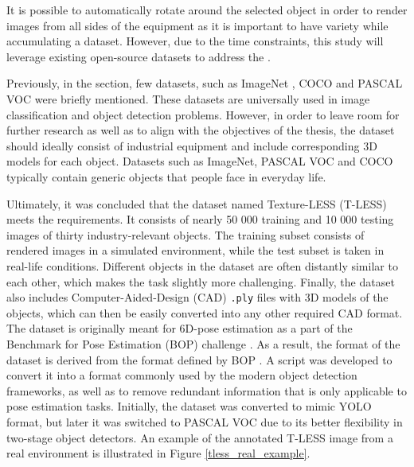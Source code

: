 It is possible to automatically rotate around the selected object in order to render images from all sides of the equipment as it is important to have variety while accumulating a dataset. However, due to the time constraints, this study will leverage existing open-source datasets to address the . 

Previously, in the  section, few datasets, such as ImageNet \cite{Russakovsky2014}, COCO \cite{Lin2014} and PASCAL VOC \cite{Everingham10} were briefly mentioned. These datasets are universally used in image classification and object detection problems. However, in order to leave room for further research as well as to align with the objectives of the thesis, the dataset should ideally consist of industrial equipment and include corresponding 3D models for each object. Datasets such as ImageNet, PASCAL VOC and COCO typically contain generic objects that people face in everyday life. 

Ultimately, it was concluded that the dataset named Texture-LESS (T-LESS)  \cite{hodan2017tless} meets the requirements. It consists of nearly 50 000 training and 10 000 testing images of thirty industry-relevant objects. The training subset consists of rendered images in a simulated environment, while the test subset is taken in real-life conditions.  Different objects in the dataset are often distantly similar to each other, which makes the task slightly more challenging. Finally, the dataset also includes Computer-Aided-Design (CAD) \texttt{.ply} files with 3D models of the objects, which can then be easily converted into any other required CAD format. The dataset is originally meant for 6D-pose estimation \cite{hodan2017tless} as a part of the Benchmark for Pose Estimation (BOP) challenge \cite{hodan2018bop}. As a result, the format of the dataset is derived from the format defined by BOP \cite{hodan2018bop_format}. A script was developed to convert it into a format commonly used by the modern object detection frameworks, as well as to remove redundant information that is only applicable to pose estimation tasks. Initially, the dataset was converted to mimic YOLO \cite{Redmon2015a} format, but later it was switched to PASCAL VOC due to its better flexibility in two-stage object detectors. An example of the annotated T-LESS image from a real environment is illustrated in Figure \ref{tless_real_example}. 

